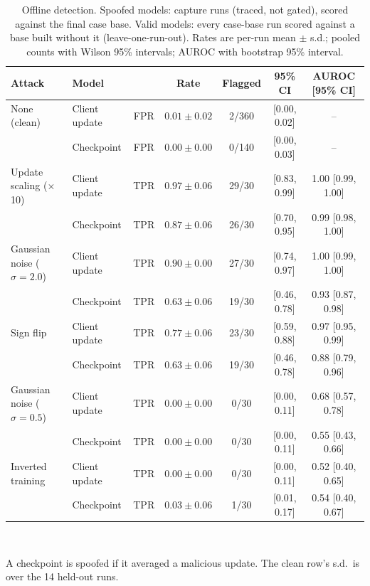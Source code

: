 \begin{table}[!t]
\centering
\caption{Offline detection. Spoofed models: capture runs (traced, not gated), scored against the final case base. Valid models: every case-base run scored against a base built without it (leave-one-run-out). Rates are per-run mean $\pm$ s.d.; pooled counts with Wilson 95\% intervals; AUROC with bootstrap 95\% interval.}
\label{tab:detection}
\footnotesize
\setlength{\tabcolsep}{4pt}
\begin{tabular}{@{}llcccc c@{}}
\toprule
\textbf{Attack} & \textbf{Model} & & \textbf{Rate} & \textbf{Flagged} & \textbf{95\% CI} & \textbf{AUROC [95\% CI]} \\
\midrule
None (clean) & Client update & FPR & $0.01 \pm 0.02$ & 2/360 & [0.00, 0.02] & -- \\
 & Checkpoint & FPR & $0.00 \pm 0.00$ & 0/140 & [0.00, 0.03] & -- \\
\midrule
Update scaling ($\times$10) & Client update & TPR & $0.97 \pm 0.06$ & 29/30 & [0.83, 0.99] & 1.00 [0.99, 1.00] \\
 & Checkpoint & TPR & $0.87 \pm 0.06$ & 26/30 & [0.70, 0.95] & 0.99 [0.98, 1.00] \\
Gaussian noise ($\sigma{=}2.0$) & Client update & TPR & $0.90 \pm 0.00$ & 27/30 & [0.74, 0.97] & 1.00 [0.99, 1.00] \\
 & Checkpoint & TPR & $0.63 \pm 0.06$ & 19/30 & [0.46, 0.78] & 0.93 [0.87, 0.98] \\
Sign flip & Client update & TPR & $0.77 \pm 0.06$ & 23/30 & [0.59, 0.88] & 0.97 [0.95, 0.99] \\
 & Checkpoint & TPR & $0.63 \pm 0.06$ & 19/30 & [0.46, 0.78] & 0.88 [0.79, 0.96] \\
Gaussian noise ($\sigma{=}0.5$) & Client update & TPR & $0.00 \pm 0.00$ & 0/30 & [0.00, 0.11] & 0.68 [0.57, 0.78] \\
 & Checkpoint & TPR & $0.00 \pm 0.00$ & 0/30 & [0.00, 0.11] & 0.55 [0.43, 0.66] \\
Inverted training & Client update & TPR & $0.00 \pm 0.00$ & 0/30 & [0.00, 0.11] & 0.52 [0.40, 0.65] \\
 & Checkpoint & TPR & $0.03 \pm 0.06$ & 1/30 & [0.01, 0.17] & 0.54 [0.40, 0.67] \\
\bottomrule
\end{tabular}
\\[2pt]
\parbox{\textwidth}{\scriptsize A checkpoint is spoofed if it averaged a malicious update. The clean row's s.d.\ is over the 14 held-out runs.}
\end{table}
